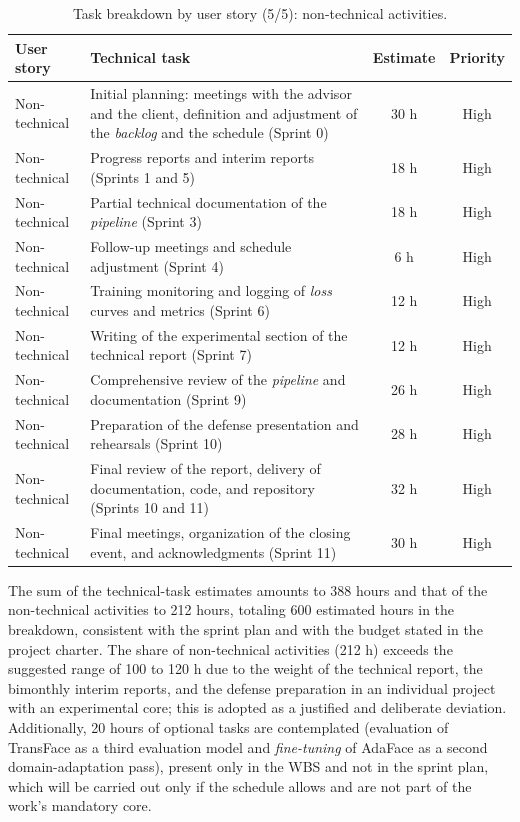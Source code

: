 \documentclass[
  11pt, %
]{charter}
\begin{document}
\begin{table}[htpb]
  \centering
  \caption{Task breakdown by user story (5/5): non-technical activities.}
  \begin{tabularx}{\linewidth}{@{}|X|X|c|c|@{}}
    \hline
    \rowcolor[HTML]{C0C0C0}
    User story & Technical task & Estimate & Priority \\ \hline

    Non-technical & Initial planning: meetings with the advisor and the client, definition and adjustment of the \textit{backlog} and the schedule (Sprint 0) & 30 h & High \\ \hline
    Non-technical & Progress reports and interim reports (Sprints 1 and 5) & 18 h & High \\ \hline
    Non-technical & Partial technical documentation of the \textit{pipeline} (Sprint 3) & 18 h & High \\ \hline
    Non-technical & Follow-up meetings and schedule adjustment (Sprint 4) & 6 h & High \\ \hline
    Non-technical & Training monitoring and logging of \textit{loss} curves and metrics (Sprint 6) & 12 h & High \\ \hline
    Non-technical & Writing of the experimental section of the technical report (Sprint 7) & 12 h & High \\ \hline
    Non-technical & Comprehensive review of the \textit{pipeline} and documentation (Sprint 9) & 26 h & High \\ \hline
    Non-technical & Preparation of the defense presentation and rehearsals (Sprint 10) & 28 h & High \\ \hline
    Non-technical & Final review of the report, delivery of documentation, code, and repository (Sprints 10 and 11) & 32 h & High \\ \hline
    Non-technical & Final meetings, organization of the closing event, and acknowledgments (Sprint 11) & 30 h & High \\ \hline

  \end{tabularx}
\end{table}

The sum of the technical-task estimates amounts to 388 hours and that of the non-technical activities to 212 hours, totaling 600 estimated hours in the breakdown, consistent with the sprint plan and with the budget stated in the project charter. The share of non-technical activities (212 h) exceeds the suggested range of 100 to 120 h due to the weight of the technical report, the bimonthly interim reports, and the defense preparation in an individual project with an experimental core; this is adopted as a justified and deliberate deviation. Additionally, 20 hours of optional tasks are contemplated (evaluation of TransFace as a third evaluation model and \textit{fine-tuning} of AdaFace as a second domain-adaptation pass), present only in the WBS and not in the sprint plan, which will be carried out only if the schedule allows and are not part of the work's mandatory core.
\end{document}
